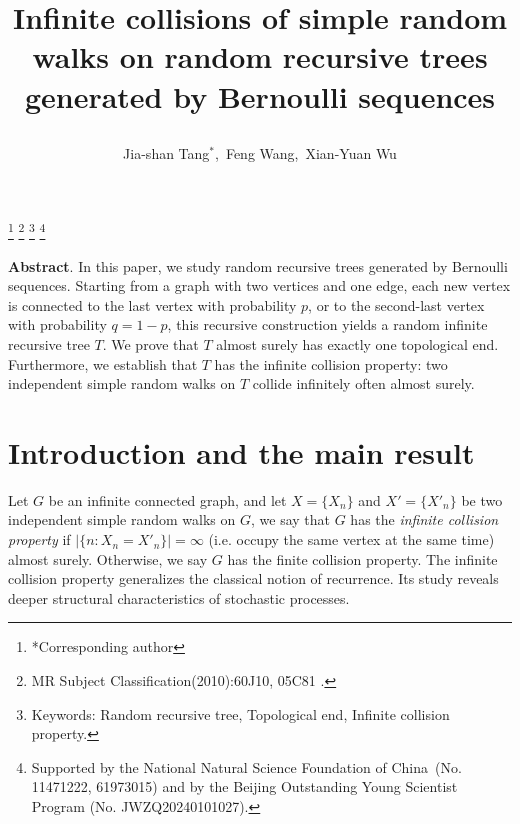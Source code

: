 \documentclass[10pt,twoside]{article}
\begin{document}
\title{\bf \Large Infinite collisions of simple random walks on random recursive trees generated by Bernoulli sequences \author{Jia-shan Tang$^{*}$,\  Feng Wang,\  Xian-Yuan Wu}\date{}} \maketitle%
\footnote{*Corresponding author}
 \footnote{MR Subject Classification(2010):60J10, 05C81 .}%
 \footnote{Keywords: Random recursive tree, Topological end, Infinite collision property.}
 \footnote{Supported by the National Natural Science Foundation of China\, (No. 11471222, 61973015) and by the Beijing Outstanding Young Scientist Program (No. JWZQ20240101027).}
\begin{center}
\begin{minipage}{135mm}

{\bf \small Abstract}.\hskip 2mm {\small
In this paper, we study random recursive trees generated by Bernoulli sequences. Starting from a graph with two vertices and one edge, each new vertex is connected to the last vertex with probability $ p $, or to the second-last vertex with probability $ q = 1-p $, this recursive construction yields a random infinite recursive tree $T$. We prove that $T$ almost surely has exactly one topological end. Furthermore, we establish that $T$ has the infinite collision property:  two independent simple random walks on $T$ collide infinitely often almost surely.\vbox{}\\}
\end{minipage}
\end{center}


\section{Introduction and the main result}
Let $G$ be an infinite connected graph, and let $ X = \{X_n\} $ and $ X' = \{X'_n\} $ be two independent simple random walks on $G$, we say that $G$ has the \textit{infinite collision property} if $ | \{ n : X_n = X'_n \} | = \infty $ (i.e. occupy the same vertex at the same time) almost surely. Otherwise, we say $G$ has the finite collision property. The infinite collision property generalizes the classical notion of recurrence. Its study reveals deeper structural characteristics of stochastic processes.
\end{document}
